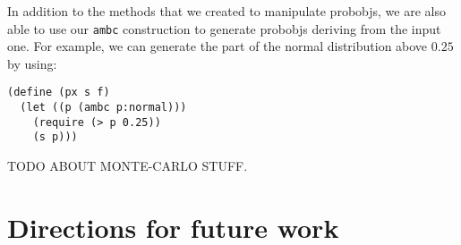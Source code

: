 \documentclass{article}
\begin{document}
In addition to the methods that we created to manipulate probobjs, we are also
able to use our \texttt{ambc} construction to generate probobjs deriving from
the input one. For example, we can generate the part of the normal distribution
above $0.25$ by using:

\begin{lstlisting}
(define (px s f) 
  (let ((p (ambc p:normal))) 
    (require (> p 0.25))
    (s p)))
\end{lstlisting}

TODO ABOUT MONTE-CARLO STUFF.
\section{Directions for future work}
\end{document}
